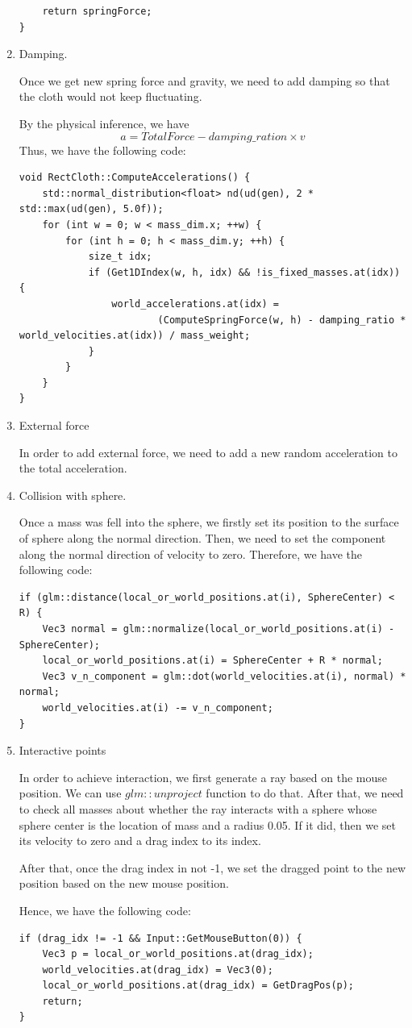\documentclass[acmtog]{acmart}
\begin{document}
\begin{enumerate}
\begin{lstlisting}
	return springForce;
}
	\end{lstlisting}
	\item Damping.
	\par Once we get new spring force and gravity, we need to add damping so that the cloth would not keep fluctuating.
	\par By the physical inference, we have
	\[a = TotalForce - damping\_ration\times v \] 
	Thus, we have the following code:
	\begin{lstlisting}
void RectCloth::ComputeAccelerations() {
	std::normal_distribution<float> nd(ud(gen), 2 * std::max(ud(gen), 5.0f));
	for (int w = 0; w < mass_dim.x; ++w) {
		for (int h = 0; h < mass_dim.y; ++h) {
			size_t idx;
			if (Get1DIndex(w, h, idx) && !is_fixed_masses.at(idx)) {
				world_accelerations.at(idx) =
						(ComputeSpringForce(w, h) - damping_ratio * world_velocities.at(idx)) / mass_weight;
			}
		}
	}
}
	\end{lstlisting}
	\item External force
	\par In order to add external force, we need to add a new random acceleration to the total acceleration.
	\item Collision with sphere.
	\par Once a mass was fell into the sphere, we firstly set its position to the surface of sphere along the normal direction. Then, we need to set the component along the normal direction of velocity to zero. Therefore, we have the following code:
	\begin{lstlisting}
if (glm::distance(local_or_world_positions.at(i), SphereCenter) < R) {
	Vec3 normal = glm::normalize(local_or_world_positions.at(i) - SphereCenter);
	local_or_world_positions.at(i) = SphereCenter + R * normal;
	Vec3 v_n_component = glm::dot(world_velocities.at(i), normal) * normal;
	world_velocities.at(i) -= v_n_component;
}
	\end{lstlisting}
	\item Interactive points
	\par In order to achieve interaction, we first generate a ray based on the mouse position. We can use $glm::unproject$ function to do that. After that, we need to check all masses about whether the ray interacts with a sphere whose sphere center is the location of mass and a radius 0.05. If it did, then we set its velocity to zero and a drag index to its index.
	\par After that, once the drag index in not -1, we set the dragged point to the new position based on the new mouse position.
	\par Hence, we have the following code:
	\begin{lstlisting}
if (drag_idx != -1 && Input::GetMouseButton(0)) {
	Vec3 p = local_or_world_positions.at(drag_idx);
	world_velocities.at(drag_idx) = Vec3(0);
	local_or_world_positions.at(drag_idx) = GetDragPos(p);
	return;
}


\end{lstlisting}
\end{enumerate}
\end{document}
